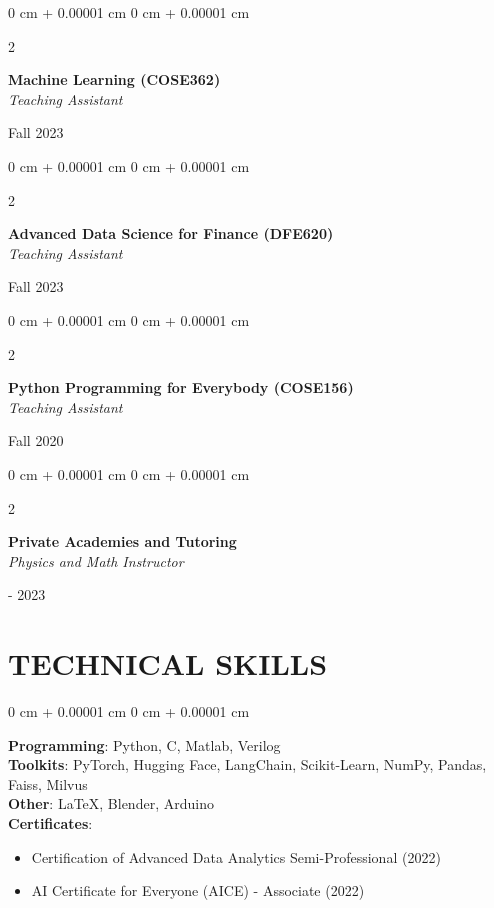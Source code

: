 \documentclass[10pt, letterpaper]{article}
\newenvironment{highlights}{
    \begin{itemize}[
        topsep=0.10 cm,
        parsep=0.10 cm,
        partopsep=0pt,
        itemsep=0pt,
        leftmargin=0 cm + 10pt
    ]
}{
    \end{itemize}
} %
\newenvironment{onecolentry}{
    \begin{adjustwidth}{
        0 cm + 0.00001 cm
    }{
        0 cm + 0.00001 cm
    }
}{
    \end{adjustwidth}
} %
\newenvironment{twocolentry}[2][]{
    \onecolentry
    \def\secondColumn{#2}
    \setcolumnwidth{\fill, 3.5 cm}
    \begin{paracol}{2}
}{
    \switchcolumn \raggedleft \secondColumn
    \end{paracol}
    \endonecolentry
} %
\begin{document}
        \begin{twocolentry}{
            Fall 2023\\ 
        }
        \textbf{Machine Learning (COSE362)} \\
        \textit{Teaching Assistant}
        \end{twocolentry}
        \vspace{0.2 cm}

        \begin{twocolentry}{
            Fall 2023\\ 
        }
        \textbf{Advanced Data Science for Finance (DFE620)} \\
        \textit{Teaching Assistant}
        \end{twocolentry}
        \vspace{0.2 cm}

        \begin{twocolentry}{
            Fall 2020\\ 
        }
        \textbf{Python Programming for Everybody (COSE156)} \\
        \textit{Teaching Assistant}
        \end{twocolentry}
        \vspace{0.2 cm}
        
        \begin{twocolentry}{
            2016 - 2023\\
        }
        \textbf{Private Academies and Tutoring} \\
        \textit{Physics and Math Instructor}
        \end{twocolentry}
    \vspace{0.2 cm}


\section{TECHNICAL SKILLS}
        \begin{onecolentry}
        \textbf{Programming}: Python, C, Matlab, Verilog \\ 
        \vspace{0.1 cm}
        \textbf{Toolkits}: PyTorch, Hugging Face, LangChain, Scikit-Learn, NumPy, Pandas, Faiss, Milvus \\ 
        \vspace{0.1 cm}
        \textbf{Other}: \LaTeX, Blender, Arduino \\
        \vspace{0.1 cm}
        \textbf{Certificates}:
        \vspace{-0.1 cm}
            \begin{highlights}
                \item Certification of Advanced Data Analytics Semi-Professional (2022)
                \vspace{-0.1 cm}
                \item AI Certificate for Everyone (AICE) - Associate (2022)
            \end{highlights}
        \end{onecolentry}
            \vspace{0.2 cm}
\end{document}
